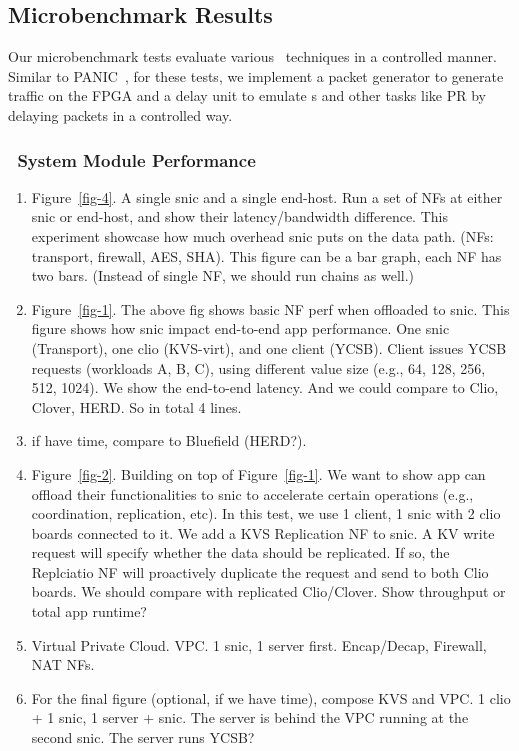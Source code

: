 \fi






\subsection{Microbenchmark Results}
Our microbenchmark tests evaluate various \snic\ techniques in a controlled manner. 
Similar to PANIC~\cite{panic-osdi20}, for these tests, we implement a packet generator to generate traffic on the FPGA
and a delay unit to emulate \nt{}s and other tasks like PR by delaying packets in a controlled way.


\subsubsection{\snic\ System Module Performance}

\fi



\begin{enumerate}
    \item Figure~\ref{fig-4}. A single snic and a single end-host. Run a set of NFs at either snic or end-host, and show their latency/bandwidth difference. This experiment showcase how much overhead snic puts on the data path. (NFs: transport, firewall, AES, SHA). This figure can be a bar graph, each NF has two bars. (Instead of single NF, we should run chains as well.)
    \item Figure~\ref{fig-1}. The above fig shows basic NF perf when offloaded to snic. This figure shows how snic impact end-to-end app performance. One snic (Transport), one clio (KVS-virt), and one client (YCSB). Client issues YCSB requests (workloads A, B, C), using different value size (e.g., 64, 128, 256, 512, 1024). We show the end-to-end latency. And we could compare to Clio, Clover, HERD. So in total 4 lines.
    \item if have time, compare to Bluefield (HERD?).
    \item Figure~\ref{fig-2}. Building on top of Figure~\ref{fig-1}. We want to show app can offload their functionalities to snic to accelerate certain operations (e.g., coordination, replication, etc). In this test, we use 1 client, 1 snic with 2 clio boards connected to it. We add a KVS Replication NF to snic. A KV write request will specify whether the data should be replicated. If so, the Replciatio NF will proactively duplicate the request and send to both Clio boards. We should compare with replicated Clio/Clover. Show throughput or total app runtime?
    \item Virtual Private Cloud. VPC. 1 snic, 1 server first. Encap/Decap, Firewall, NAT NFs.
    \item For the final figure (optional, if we have time), compose KVS and VPC. 1 clio + 1 snic, 1 server + snic. The server is behind the VPC running at the second snic. The server runs YCSB? 
\end{enumerate}

